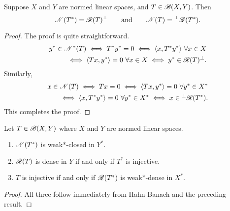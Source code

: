 \begin{theorem}
    Suppose $X$ and $Y$ are normed linear spaces, and $T\in\mathscr B(X, Y)$. Then 
    \begin{equation*}
        \mathscr N(T^\ast) = \mathscr R(T)^\perp\qquad\text{and}\qquad\mathscr N(T) = {}^\perp\mathscr R(T^\ast).
    \end{equation*}
\end{theorem}
\begin{proof}
    The proof is quite straightforward. 
    \begin{align*}
        y^\ast\in\mathscr N^\ast(T)\iff T^\ast y^\ast = 0\iff \langle x, T^\ast y^\ast\rangle~\forall x\in X\\
        \iff \langle Tx, y^\ast\rangle = 0~\forall x\in X\iff y^\ast\in\mathscr R(T)^{\perp}.
    \end{align*}
    Similarly, 
    \begin{align*}
        x\in\mathscr N(T)\iff Tx = 0\iff \langle Tx, y^\ast\rangle = 0~\forall y^\ast\in X^\ast\\
        \iff\langle x, T^\ast y^\ast\rangle = 0~\forall y^\ast\in X^\ast\iff x\in{}^\perp\mathscr R(T^\ast).
    \end{align*}
    This completes the proof.
\end{proof}

\begin{corollary}\label{cor:for-closed-range}
    Let $T\in\mathscr B(X, Y)$ where $X$ and $Y$ are normed linear spaces.
    \begin{enumerate}[label=(\alph*)]
        \item $\mathscr N(T^\ast)$ is weak*-closed in $Y^\ast$. 
        \item $\mathscr R(T)$ is dense in $Y$ if and only if $T^\ast$ is injective. 
        \item $T$ is injective if and only if $\mathscr R(T^\ast)$ is weak*-dense in $X^\ast$.
    \end{enumerate}
\end{corollary}
\begin{proof}
    All three follow immediately from Hahn-Banach and the preceding result.
\end{proof}

